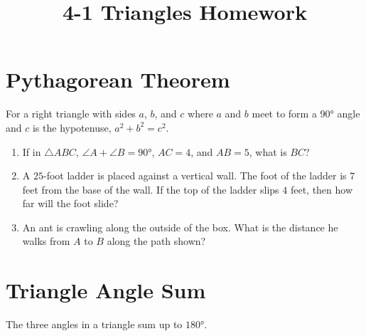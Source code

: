 \documentclass{article}
\title{4-1 Triangles Homework}
\date{}
\author{}
\begin{document}
\maketitle

\section*{Pythagorean Theorem}
For a right triangle with sides $a$, $b$, and $c$ where $a$ and $b$ meet to form a $\ang{90}$ angle
and $c$ is the hypotenuse, $a^2 + b^2 = c^2$.

\begin{enumerate}
    \item If in $\triangle ABC$, $\angle A + \angle B = \ang{90}$, $AC = 4$, and $AB = 5$, what is $BC$?
        \vspace{3cm}
    \item A $25$-foot ladder is placed against a vertical wall.
        The foot of the ladder is $7$ feet from the base of the wall.
        If the top of the ladder slips $4$ feet, then how far will the foot slide?
        \vspace{3cm}
    \item An ant is crawling along the outside of the box.
    What is the distance he walks from $A$ to $B$ along the path shown?
        \begin{center}
        \end{center}
        \vspace{3cm}
\end{enumerate}

\newpage

\section*{Triangle Angle Sum}
The three angles in a triangle sum up to $\ang{180}$.
\end{document}
